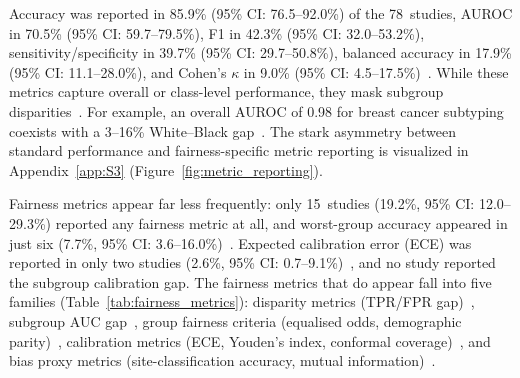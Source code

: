 Accuracy was reported in 85.9\% (95\% CI: 76.5--92.0\%) of the 78~studies, AUROC in 70.5\% (95\% CI: 59.7--79.5\%),
F1 in 42.3\% (95\% CI: 32.0--53.2\%), sensitivity/specificity in 39.7\% (95\% CI: 29.7--50.8\%), balanced accuracy in
17.9\% (95\% CI: 11.1--28.0\%), and Cohen's $\kappa$ in 9.0\% (95\% CI: 4.5--17.5\%)~\citep{campanella2019clinical,
xu2017large, tasci2022bias, asadiaghbolagh2024learning}. While these metrics
capture overall or class-level performance, they mask subgroup
disparities~\citep{chen2023algorithmic, riccilara2022addressing}. For example, an
overall AUROC of 0.98 for breast cancer subtyping coexists with a
3--16\% White--Black gap~\citep{vaidya2024demographic}. The stark asymmetry between standard performance and fairness-specific metric reporting is visualized in Appendix~\ref{app:S3} (Figure~\ref{fig:metric_reporting}).

\label{sec:results:reproducibility}
\label{sec:results:reporting}
Fairness metrics appear far less frequently: only 15~studies (19.2\%, 95\% CI: 12.0--29.3\%) reported any fairness metric at all, and worst-group
accuracy appeared in just six
(7.7\%, 95\% CI: 3.6--16.0\%)~\citep{zong2023medfair, koh2021wilds, soltan2024challenges}.
Expected calibration error (ECE) was reported in only two studies (2.6\%, 95\% CI: 0.7--9.1\%)~\citep{roschewitz2023automatic, zong2023medfair}, and
no study reported the subgroup calibration gap. The fairness metrics that do appear fall into five
families (Table~\ref{tab:fairness_metrics}): disparity metrics (TPR/FPR
gap)~\citep{vaidya2024demographic, huang2025knowledge,
soltan2024challenges}, subgroup AUC
gap~\citep{vaidya2024demographic, zong2023medfair,
lin2025contrastive}, group fairness criteria (equalised odds, demographic
parity)~\citep{soltan2024challenges, sufian2024mitigating,
cecconi2024fairness}, calibration metrics (ECE, Youden's index, conformal
coverage)~\citep{roschewitz2023automatic, zong2023medfair,
olsson2022estimating}, and bias proxy
metrics (site-classification accuracy, mutual
information)~\citep{dehkharghanian2023biased, bidgoli2022bias,
mazaheri2023ranking, kheiri2025investigation, hosseini2023proportionally}.

